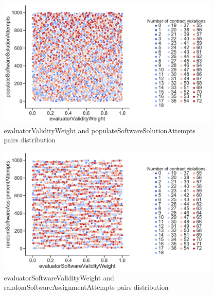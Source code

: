 \begin{figure}
	\centering
	\includegraphics[width=\textwidth]{images/PairsDistr/evaluatorValidityWeight_populateSoftwareSolutionAttempts.pdf}
	\caption[evaluatorValidityWeight and populateSoftwareSolutionAttempts pairs distribution]{evaluatorValidityWeight and populateSoftwareSolutionAttempts pairs distribution}
	\label{fig:evaluatorValidityWeight_populateSoftwareSolutionAttempts_pair}
\end{figure}
\begin{figure}
	\centering
	\includegraphics[width=\textwidth]{images/PairsDistr/evaluatorSoftwareValidityWeight_randomSoftwareAssignmentAttempts.pdf}
	\caption[evaluatorSoftwareValidityWeight and randomSoftwareAssignmentAttempts pairs distribution]{evaluatorSoftwareValidityWeight and randomSoftwareAssignmentAttempts pairs distribution}   
	\label{fig:evaluatorSoftwareValidityWeight_randomSoftwareAssignmentAttempts_pair}
\end{figure}

